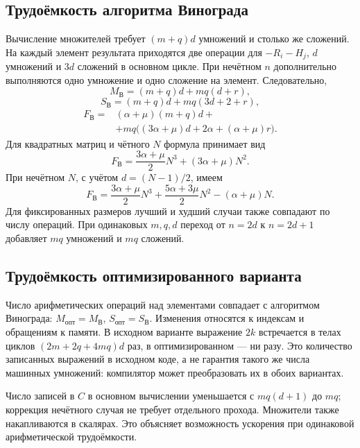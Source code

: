 \documentclass[14pt,a4paper]{extarticle}
\numberwithin{equation}{section}
\begin{document}
\subsection{Трудоёмкость алгоритма Винограда}
Вычисление множителей требует $(m+q)d$ умножений и столько же сложений. На каждый элемент результата приходятся две операции для $-R_i-H_j$, $d$ умножений и $3d$ сложений в основном цикле. При нечётном $n$ дополнительно выполняются одно умножение и одно сложение на элемент. Следовательно,
\begin{equation}
M_{\text{В}}=(m+q)d+mq(d+r),
\end{equation}
\begin{equation}
S_{\text{В}}=(m+q)d+mq(3d+2+r),
\end{equation}
\begin{equation}\label{eq:fw}
\begin{split}
F_{\text{В}}={}&(\alpha+\mu)(m+q)d+{}\\
&+mq\bigl((3\alpha+\mu)d+2\alpha+(\alpha+\mu)r\bigr).
\end{split}
\end{equation}
Для квадратных матриц и чётного $N$ формула принимает вид
\begin{equation}
F_{\text{В}}=\frac{3\alpha+\mu}{2}N^3+(3\alpha+\mu)N^2.
\end{equation}
При нечётном $N$, с учётом $d=(N-1)/2$, имеем
\begin{equation}
F_{\text{В}}=\frac{3\alpha+\mu}{2}N^3+
\frac{5\alpha+3\mu}{2}N^2-(\alpha+\mu)N.
\end{equation}
Для фиксированных размеров лучший и худший случаи также совпадают по числу операций. При одинаковых $m,q,d$ переход от $n=2d$ к $n=2d+1$ добавляет $mq$ умножений и $mq$ сложений.

\subsection{Трудоёмкость оптимизированного варианта}
Число арифметических операций над элементами совпадает с алгоритмом Винограда: $M_{\text{опт}}=M_{\text{В}}$, $S_{\text{опт}}=S_{\text{В}}$. Изменения относятся к индексам и обращениям к памяти. В исходном варианте выражение $2k$ встречается в телах циклов $(2m+2q+4mq)d$ раз, в оптимизированном — ни разу. Это количество записанных выражений в исходном коде, а не гарантия такого же числа машинных умножений: компилятор может преобразовать их в обоих вариантах.

Число записей в $C$ в основном вычислении уменьшается с $mq(d+1)$ до $mq$; коррекция нечётного случая не требует отдельного прохода. Множители также накапливаются в скалярах. Это объясняет возможность ускорения при одинаковой арифметической трудоёмкости.
\end{document}
